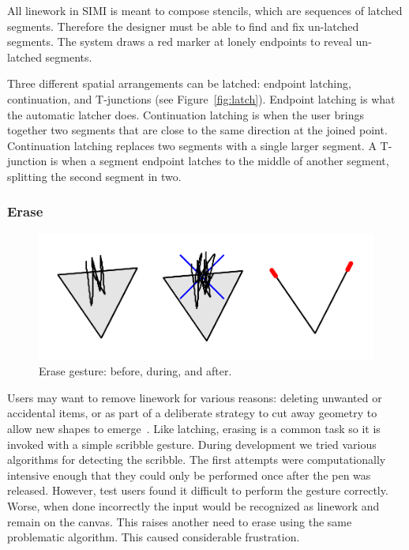 \documentclass{article}
\begin{document}
All linework in SIMI is meant to compose stencils, which are sequences
of latched segments. Therefore the designer must be able to find and
fix un-latched segments. The system draws a red marker at lonely
endpoints to reveal un-latched segments.

Three different spatial arrangements can be latched: endpoint
latching, continuation, and T-junctions (see
Figure~\ref{fig:latch}). Endpoint latching is what the automatic
latcher does. Continuation latching is when the user brings together
two segments that are close to the same direction at the joined
point. Continuation latching replaces two segments with a single
larger segment. A T-junction is when a segment endpoint latches to the
middle of another segment, splitting the second segment in two.

\subsubsection{Erase}

\begin{figure}[h]
  \centering
  \includegraphics[width=0.9\linewidth]{img/erase-all.pdf}
  \caption{Erase gesture: before, during, and after.}
  \label{fig:erase}
\end{figure}

Users may want to remove linework for various reasons: deleting
unwanted or accidental items, or as part of a deliberate strategy to
cut away geometry to allow new shapes to
emerge~\cite{zeleznik-lineogrammer}. Like latching, erasing is a
common task so it is invoked with a simple scribble gesture. During
development we tried various algorithms for detecting the
scribble. The first attempts were computationally intensive enough
that they could only be performed once after the pen was
released. However, test users found it difficult to perform the
gesture correctly. Worse, when done incorrectly the input would be
recognized as linework and remain on the canvas. This raises another
need to erase using the same problematic algorithm. This caused
considerable frustration.
\end{document}
